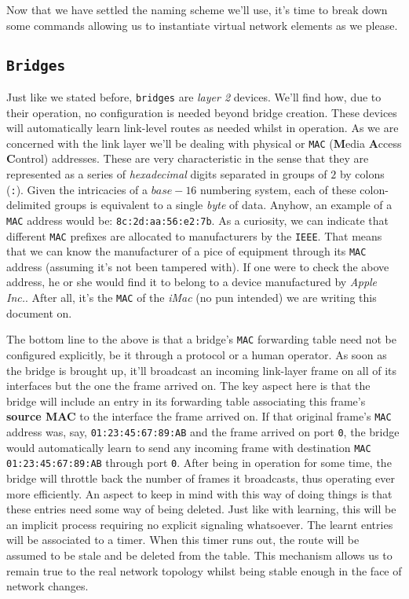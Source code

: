         Now that we have settled the naming scheme we'll use, it's time to break down some commands allowing us to instantiate virtual network elements as we please.

        \subsection{\texttt{Bridges}}
            Just like we stated before, \texttt{bridges} are \textit{layer 2} devices. We'll find how, due to their operation, no configuration is needed beyond bridge creation. These devices will automatically learn link-level routes as needed whilst in operation. As we are concerned with the link layer we'll be dealing with physical or \texttt{MAC} (\textbf{M}edia \textbf{A}ccess \textbf{C}ontrol) addresses. These are very characteristic in the sense that they are represented as a series of \textit{hexadecimal} digits separated in groups of $2$ by colons (\texttt{:}). Given the intricacies of a $base-16$ numbering system, each of these colon-delimited groups is equivalent to a single \textit{byte} of data. Anyhow, an example of a \texttt{MAC} address would be: \texttt{8c:2d:aa:56:e2:7b}. As a curiosity, we can indicate that different \texttt{MAC} prefixes are allocated to manufacturers by the \texttt{IEEE}. That means that we can know the manufacturer of a pice of equipment through its \texttt{MAC} address (assuming it's not been tampered with). If one were to check the above address, he or she would find it to belong to a device manufactured by \textit{Apple Inc.}. After all, it's the \texttt{MAC} of the \textit{iMac} (no pun intended) we are writing this document on.

            The bottom line to the above is that a bridge's \texttt{MAC} forwarding table need not be configured explicitly, be it through a protocol or a human operator. As soon as the bridge is brought up, it'll broadcast an incoming link-layer frame on all of its interfaces but the one the frame arrived on. The key aspect here is that the bridge will include an entry in its forwarding table associating this frame's \textbf{source MAC} to the interface the frame arrived on. If that original frame's \texttt{MAC} address was, say, \texttt{01:23:45:67:89:AB} and the frame arrived on port \texttt{0}, the bridge would automatically learn to send any incoming frame with destination \texttt{MAC 01:23:45:67:89:AB} through port \texttt{0}. After being in operation for some time, the bridge will throttle back the number of frames it broadcasts, thus operating ever more efficiently. An aspect to keep in mind with this way of doing things is that these entries need some way of being deleted. Just like with learning, this will be an implicit process requiring no explicit signaling whatsoever. The learnt entries will be associated to a timer. When this timer runs out, the route will be assumed to be stale and be deleted from the table. This mechanism allows us to remain true to the real network topology whilst being stable enough in the face of network changes.

